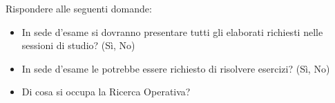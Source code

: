 \documentclass{beamer}
\begin{document}
\generatitolo

\begin{frame}{\domande}
Rispondere alle seguenti domande:

    \begin{itemize}
     \item  In sede d'esame si dovranno presentare tutti gli elaborati richiesti nelle sessioni di studio? (S\`i, No)
     \item In sede d'esame le potrebbe essere richiesto di risolvere esercizi? (S\`i, No)
     \item  Di cosa si occupa la Ricerca Operativa?
    \end{itemize}
\end{frame}
\end{document}
